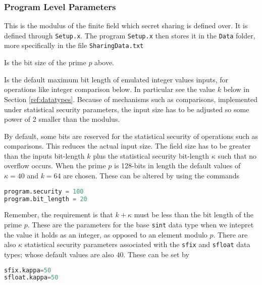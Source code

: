 \subsubsection{Program Level Parameters}

This is the modulus of the finite field which secret sharing is defined over.
It is defined through \verb|Setup.x|. 
The program \verb+Setup.x+ then stores it in the \verb|Data| folder, more specifically in the file \verb|SharingData.txt|

Is the bit size of the prime $p$ above. 

Is the default maximum bit length of emulated integer values inputs,
for operations like integer comparison below. 
In particular see the value $k$ below in Section \ref{ref:datatypes}.
Because of mechanisms such as comparisons, implemented under statistical security parameters, the input size has to be adjusted so 
some power of 2 smaller than the modulus. 

By default, some bits are reserved for the statistical security of operations such as comparisons. This reduces the actual input size.
The field size has to be greater than the inputs bit-length $k$ plus the statistical security bit-length $\kappa$ such that no overflow occurs. 
When the prime $p$ is 128-bits in length the default values of $\kappa=40$ and $k=64$ are chosen.
These can be altered by using the commands
\begin{lstlisting}[language={python}]
program.security = 100
program.bit_length = 20
\end{lstlisting}
Remember, the requirement is that $k+\kappa$ must be less than the bit length of the prime $p$.
These are the parameters for the base \verb+sint+ data type when we intepret the value it holds
as an integer, as opposed to an element modulo $p$.
There are also $\kappa$ statistical security parameters associated with the \verb+sfix+ and \verb+sfloat+ data types;
whose default values are also $40$.
These can be set by
\begin{lstlisting}[language={python}]
sfix.kappa=50
sfloat.kappa=50
\end{lstlisting}


